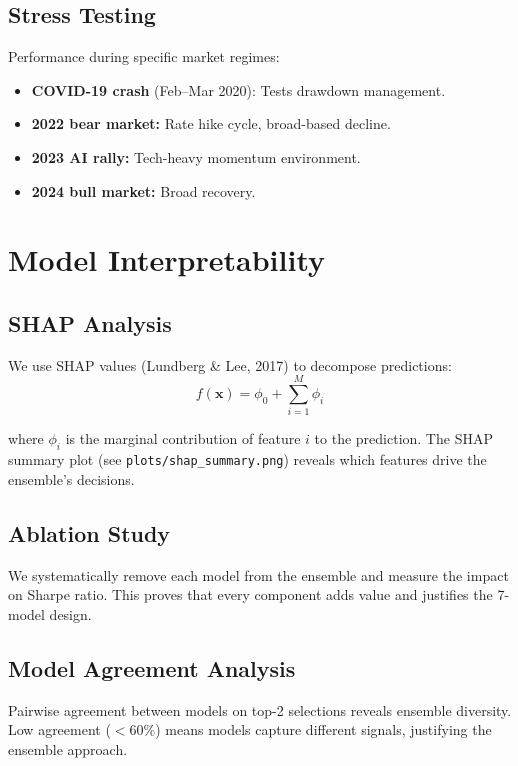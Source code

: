 \documentclass[12pt,a4paper]{article}
\begin{document}
\subsection{Stress Testing}
Performance during specific market regimes:
\begin{itemize}
    \item \textbf{COVID-19 crash} (Feb--Mar 2020): Tests drawdown management.
    \item \textbf{2022 bear market:} Rate hike cycle, broad-based decline.
    \item \textbf{2023 AI rally:} Tech-heavy momentum environment.
    \item \textbf{2024 bull market:} Broad recovery.
\end{itemize}

\section{Model Interpretability}

\subsection{SHAP Analysis}
We use SHAP values (Lundberg \& Lee, 2017) to decompose predictions:
\begin{equation}
    f(\mathbf{x}) = \phi_0 + \sum_{i=1}^{M} \phi_i
\end{equation}

where $\phi_i$ is the marginal contribution of feature $i$ to the prediction. The SHAP summary plot (see \texttt{plots/shap\_summary.png}) reveals which features drive the ensemble's decisions.

\subsection{Ablation Study}
We systematically remove each model from the ensemble and measure the impact on Sharpe ratio. This proves that every component adds value and justifies the 7-model design.

\subsection{Model Agreement Analysis}
Pairwise agreement between models on top-2 selections reveals ensemble diversity. Low agreement ($< 60\%$) means models capture different signals, justifying the ensemble approach.
\end{document}
